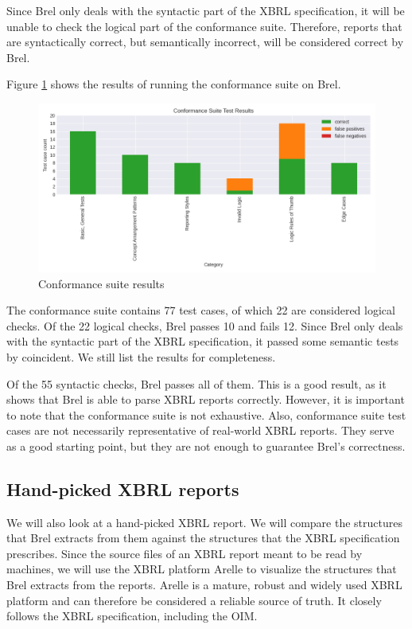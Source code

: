 Since Brel only deals with the syntactic part of the XBRL specification, 
it will be unable to check the logical part of the conformance suite.
Therefore, reports that are syntactically correct, but semantically incorrect, will be considered correct by Brel.

Figure \ref{fig:conformance_suite} shows the results of running the conformance suite on Brel.

\begin{figure}[H]
  \centering
  \includegraphics[width=1\textwidth]{images/seattle_method_test_results.png}
    \caption{Conformance suite results}
    \label{fig:conformance_suite}
\end{figure}

The conformance suite contains 77 test cases, of which 22 are considered logical checks.
Of the 22 logical checks, Brel passes 10 and fails 12.
Since Brel only deals with the syntactic part of the XBRL specification,
it passed some semantic tests by coincident.
We still list the results for completeness.

Of the 55 syntactic checks, Brel passes all of them.
This is a good result, as it shows that Brel is able to parse XBRL reports correctly.
However, it is important to note that the conformance suite is not exhaustive.
Also, conformance suite test cases are not necessarily representative of real-world XBRL reports.
They serve as a good starting point, but they are not enough to guarantee Brel's correctness.

\subsection{Hand-picked XBRL reports}

We will also look at a hand-picked XBRL report.
We will compare the structures that Brel extracts from them against the structures that the XBRL specification prescribes.
Since the source files of an XBRL report meant to be read by machines,
we will use the XBRL platform Arelle to visualize the structures that Brel extracts from the reports.
Arelle is a mature, robust and widely used XBRL platform and can therefore be considered a reliable source of truth.
It closely follows the XBRL specification, including the OIM.


